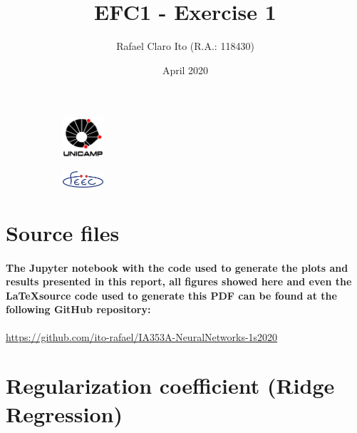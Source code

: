 \documentclass[a4paper]{article}    %
\begin{document}
\begin{figure}
    \centering
    \begin{subfigure}{0.45\textwidth}
        \centering
        \includegraphics[width=1.5cm]{unicamp}
    \end{subfigure}
    \hfill
    \begin{subfigure}{0.45\textwidth}
        \centering
        \includegraphics[width=1.5cm]{feec}
    \end{subfigure}
\end{figure}

\title{EFC1 - Exercise 1}
\author{Rafael Claro Ito (R.A.: 118430)}
\date{April 2020}
\maketitle
\newpage

\section{Source files}

\paragraph{The Jupyter notebook with the code used to generate the plots and results presented in this report, all figures showed here and even the \LaTeX \space source code used to generate this PDF can be found at the following GitHub repository:}

\begin{center}
    {\url{https://github.com/ito-rafael/IA353A-NeuralNetworks-1s2020}}
\end{center}

\section{Regularization coefficient (Ridge Regression)}
\end{document}
